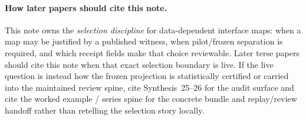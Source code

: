 \documentclass[11pt]{article}
\begin{document}
\paragraph{How later papers should cite this note.}
This note owns the \emph{selection discipline} for data-dependent interface maps: when a map may be justified by a published witness, when pilot/frozen separation is required, and which receipt fields make that choice reviewable. Later terse papers should cite this note when that exact selection boundary is live. If the live question is instead how the frozen projection is statistically certified or carried into the maintained review spine, cite Synthesis~25--26 for the audit surface and cite the worked example / series spine for the concrete bundle and replay/review handoff rather than retelling the selection story locally.\cite{series:workedexample,series:seriesspines}
\end{document}
